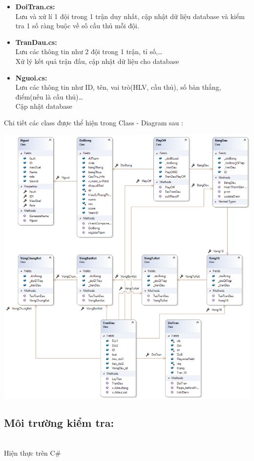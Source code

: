 \documentclass[a4paper]{article}
\begin{document}
\begin{itemize}
\item \textbf{DoiTran.cs:}\\
Lưu và xử lí 1 đội trong 1 trận duy nhất, cập nhật dữ liệu database và kiểm tra 1 số ràng buộc về số cầu thủ mỗi đội.
\item \textbf{TranDau.cs:}\\
Lưu các thông tin như 2 đội trong 1 trận, tỉ số,… \\
Xử lý kết quả trận đấu, cập nhật dữ liệu cho database
\item \textbf{Nguoi.cs:}\\
Lưu các thông tin như ID, tên, vai trò(HLV, cầu thủ), số bàn thắng, điểm(nếu là cầu thủ)…\\
Cập nhật database
\end{itemize}
Chi tiết các class được thể hiện trong Class - Diagram sau : 
\begin{center}
    \includegraphics[scale=0.6]{WorldCup_ClassDiagram.png}  \\ 
\end{center}
\subsection{Môi trường kiểm tra:}\\
\hspace{0.5cm}Hiện thực trên C\#
\end{document}
